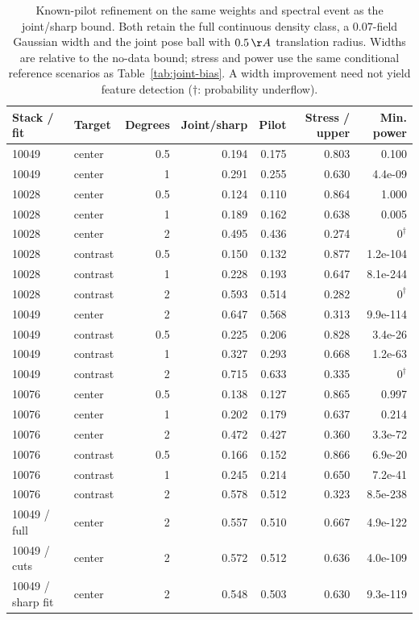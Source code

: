 \begin{table}[t]
\centering
\begin{tabular}{llrrrrr}
\toprule
Stack / fit & Target & Degrees & Joint/sharp & Pilot & Stress / upper & Min. power \\
\midrule
10049 & center & 0.5 & 0.194 & 0.175 & 0.803 & 0.100 \\
10049 & center & 1 & 0.291 & 0.255 & 0.630 & 4.4e-09 \\
10028 & center & 0.5 & 0.124 & 0.110 & 0.864 & 1.000 \\
10028 & center & 1 & 0.189 & 0.162 & 0.638 & 0.005 \\
10028 & center & 2 & 0.495 & 0.436 & 0.274 & $0^\dagger$ \\
10028 & contrast & 0.5 & 0.150 & 0.132 & 0.877 & 1.2e-104 \\
10028 & contrast & 1 & 0.228 & 0.193 & 0.647 & 8.1e-244 \\
10028 & contrast & 2 & 0.593 & 0.514 & 0.282 & $0^\dagger$ \\
10049 & center & 2 & 0.647 & 0.568 & 0.313 & 9.9e-114 \\
10049 & contrast & 0.5 & 0.225 & 0.206 & 0.828 & 3.4e-26 \\
10049 & contrast & 1 & 0.327 & 0.293 & 0.668 & 1.2e-63 \\
10049 & contrast & 2 & 0.715 & 0.633 & 0.335 & $0^\dagger$ \\
10076 & center & 0.5 & 0.138 & 0.127 & 0.865 & 0.997 \\
10076 & center & 1 & 0.202 & 0.179 & 0.637 & 0.214 \\
10076 & center & 2 & 0.472 & 0.427 & 0.360 & 3.3e-72 \\
10076 & contrast & 0.5 & 0.166 & 0.152 & 0.866 & 6.9e-20 \\
10076 & contrast & 1 & 0.245 & 0.214 & 0.650 & 7.2e-41 \\
10076 & contrast & 2 & 0.578 & 0.512 & 0.323 & 8.5e-238 \\
10049 / full & center & 2 & 0.557 & 0.510 & 0.667 & 4.9e-122 \\
10049 / cuts & center & 2 & 0.572 & 0.512 & 0.636 & 4.0e-109 \\
10049 / sharp fit & center & 2 & 0.548 & 0.503 & 0.630 & 9.3e-119 \\
\bottomrule
\end{tabular}
\caption{Known-pilot refinement on the same weights and spectral event as the joint/sharp bound. Both retain the full continuous density class, a $0.07$-field Gaussian width and the joint pose ball with $0.5\,\AA$ translation radius. Widths are relative to the no-data bound; stress and power use the same conditional reference scenarios as Table~\ref{tab:joint-bias}. A width improvement need not yield feature detection ($\dagger$: probability underflow).}
\label{tab:pilot-pairing}
\end{table}
